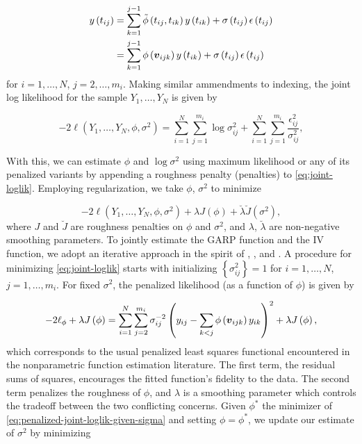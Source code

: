 \documentclass[12pt]{article}
\newcommand{\bfv}{\mbox{\boldmath $v$}}
\theoremstyle{definition}
\begin{document}
\begin{align}
\begin{split} \label{eq:cholesky-regression-model-2} 
y\left(t_{ij} \right)  &= \sum_{k=1}^{j-1} \tilde{\phi}\left(t_{ij} ,t_{ik}\right) y\left(t_{ik}\right) + \sigma\left(t_{ij}\right)\epsilon\left(t_{ij}\right)  \\
&= \sum_{k=1}^{j-1} \phi\left(\bfv_{ijk}\right) y\left(t_{ik}\right) + \sigma\left(t_{ij}\right)\epsilon\left(t_{ij}\right)
\end{split}
\end{align}
\noindent
for $i = 1,\dots, N$, $j = 2,\dots, m_i$.
\noindent
Making similar ammendments to indexing, the joint log likelihood for the sample $Y_1, \dots, Y_N$ is given by  

\begin{equation} \label{eq:joint-loglik}
-2\ell\left( Y_1,\dots, Y_N, \phi, \sigma^2 \right) = \sum_{i = 1}^N \sum_{j = 1}^{m_i} \log \sigma_{ij}^2  + \sum_{i = 1}^N \sum_{j = 1}^{m_i} \frac {\epsilon_{ij}^2}{\sigma_{ij}^2},
\end{equation}

\bigskip

With this, we can estimate $\phi$ and $\log\sigma^2$ using maximum likelihood or any of its penalized variants by appending a roughness penalty (penalties) to \ref{eq:joint-loglik}. Employing regularization, we take $\phi$, $\sigma^2$ to minimize 

\begin{equation} \label{eq:penalized-joint-loglik}
-2\ell\left( Y_1,\dots, Y_N, \phi, \sigma^2 \right) +    \lambda J\left( \phi \right) +  \breve{\lambda}\breve{J}\left( \sigma^2 \right),
\end{equation}
\noindent
where $J$ and $\breve{J}$ are roughness penalties on $\phi$ and $\sigma^2$, and $\lambda$, $\breve{\lambda}$ are non-negative smoothing parameters.  To jointly estimate the GARP function and the IV function, we adopt an iterative approach in the spirit of \citet{huang2006covariance}, \citet{huang2007estimation}, and \citet{pourahmadi2000maximum}. A procedure for minimizing \ref{eq:joint-loglik} starts with initializing $\left\{\sigma^2_{ij}\right\} = 1$ for $i = 1,\dots, N$, $j = 1,\dots, m_i$.  For fixed $\sigma^2$, the penalized likelihood (as a function of $\phi$) is given by

\begin{equation} \label{eq:penalized-joint-loglik-given-sigma}
-2\ell_\phi + \lambda J\left(\phi\right) = \sum_{i=1}^N \sum_{j=2}^{m_i} \sigma^{-2}_{ij}\left( y_{ij} - \sum_{k<j} \phi\left(\bfv_{ijk}\right) y_{ik}  \right)^2 + \lambda J\left( \phi \right),
\end{equation}
\noindent
which corresponds to the usual penalized least squares functional encountered  in the nonparametric function estimation literature. The first term, the residual sums of squares, encourages the fitted function's fidelity to the data. The second term penalizes the roughness of $\phi$, and $\lambda$ is a smoothing parameter which controls the tradeoff between the two conflicting concerns. Given $\phi^*$ the minimizer of \ref{eq:penalized-joint-loglik-given-sigma} and setting $\phi = \phi^*$, we update our estimate of $\sigma^2$ by minimizing 
\end{document}
